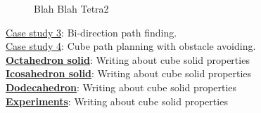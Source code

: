 \begin{center}
\begin{figure}[h]
\hfill
{}
\caption{Blah Blah Tetra2}
\end{figure}
\end{center}

\noindent\uline{Case study 3}: Bi-direction path finding.\\

\noindent\uline{Case study 4}: Cube path planning with obstacle avoiding.\\

\noindent\uline{\textbf{Octahedron solid}}:
Writing about cube solid properties\\

\noindent\uline{\textbf{Icosahedron solid}}:
Writing about cube solid properties\\

\noindent\uline{\textbf{Dodecahedron}}:
Writing about cube solid properties\\


\noindent\uline{\textbf{Experiments}}:
Writing about cube solid properties\\

